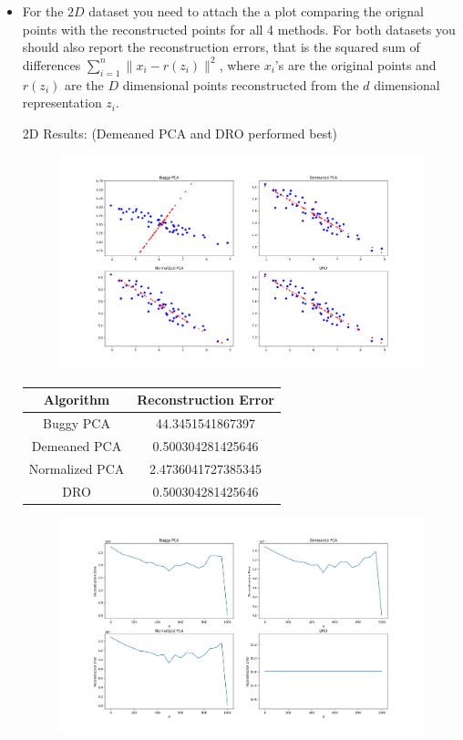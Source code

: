 \documentclass[a4paper]{article}
\newcounter{thm}
\theoremstyle{definition}
\newenvironment{soln}{
    \leavevmode\color{blue}\ignorespaces
}{}
\begin{document}
\begin{itemize}
\item
For the $2D$ dataset you need to attach the a 
plot comparing the orignal points with the reconstructed points for all 4
methods.
For both datasets you should also report the reconstruction errors, that is the squared sum of
differences $\sum_{i=1}^n \|x_i - r(z_i)\|^2$,
where $x_i$'s are the original points and $r(z_i)$ are the $D$ dimensional points
reconstructed from the 
$d$ dimensional representation $z_i$. \\
\begin{soln}
    2D Results: (Demeaned PCA and DRO performed best)
    \begin{figure}[h]
        \centering
        \includegraphics[width=1.0\textwidth]{images/pca_combined.png}
    \end{figure}
    \begin{center}
	\begin{tabular}{ c | c}
         Algorithm & Reconstruction Error \\ \hline
         Buggy PCA & 44.3451541867397 \\ \hline
         Demeaned PCA & 0.500304281425646 \\ \hline
         Normalized PCA & 2.4736041727385345 \\ \hline
         DRO & 0.500304281425646 \\
        \end{tabular}
    \end{center}
    \begin{figure}[h]
        \centering
        \includegraphics[width=1.0\textwidth]{images/pca_1000d.png}

\end{figure}
\end{soln}
\end{itemize}
\end{document}
